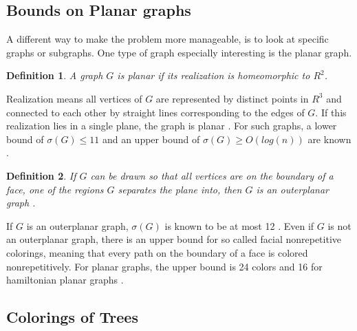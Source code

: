 \documentclass[12pt,a4paper]{article}
\newtheorem{definition}{Definition}
\begin{document}
\subsection{Bounds on Planar graphs}

A different way to make the problem more manageable, is to look at specific graphs or subgraphs. One type of graph especially interesting is the planar graph. 
\begin{definition}
A graph $G$ is planar if its realization is homeomorphic to $R^2$. 
\end{definition}
Realization means all vertices of $G$ are represented by distinct points in $R^3$ and connected to each other by straight lines corresponding to the edges of $G$. If this realization lies in a single plane, the graph is planar \citep[p. 21]{Bollobas1998}. For such graphs, a lower bound of $\sigma(G) \leq 11$ and an upper bound of $\sigma(G) \geq O(log(n))$ are known \citep{Dujmovic2012}. 
\begin{definition}
If $G$ can be drawn so that all vertices are on the boundary of a face, one of the regions $G$ separates the plane into, then $G$ is an outerplanar graph \citep[p. 36]{Bollobas1998}.
\end{definition}
If $G$ is an outerplanar graph,  $\sigma(G)$ is known to be at most 12 \citep{Barat2007}. Even if $G$ is not an outerplanar graph, there is an upper bound for so called facial nonrepetitive colorings, meaning that every path on the boundary of a face is colored nonrepetitively. For planar graphs, the upper bound is 24 colors \citep{Barat2013} and 16 for hamiltonian planar graphs \citep{Harant2011}. 

\subsection{Colorings of Trees}
\end{document}
